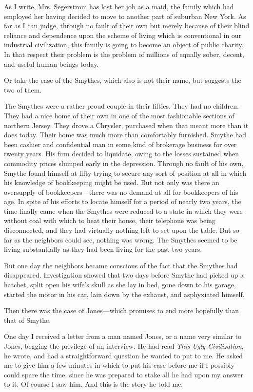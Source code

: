 \documentclass{book}
\begin{document}
As I write, Mrs. Segerstrom has lost her job as a maid, the family which had employed her having decided to move to another part of suburban New York. As far as I can judge, through no fault of their own but merely because of their blind reliance and dependence upon the scheme of living which is conventional in our industrial civilization, this family is going to become an object of public charity. In that respect their problem is the problem of millions of equally sober, decent, and useful human beings today.

Or take the case of the Smythes, which also is not their name, but suggests the two of them.

The Smythes were a rather proud couple in their fifties. They had no children. They had a nice home of their own in one of the most fashionable sections of northern Jersey. They drove a Chrysler, purchased when that meant more than it does today. Their home was much more than comfortably furnished. Smythe had been cashier and confidential man in some kind of brokerage business for over twenty years. His firm decided to liquidate, owing to the losses sustained when commodity prices slumped early in the depression. Through no fault of his own, Smythe found himself at fifty trying to secure any sort of position at all in which his knowledge of bookkeeping might be used. But not only was there an oversupply of bookkeepers—there was no demand at all for bookkeepers of his age. In spite of his efforts to locate himself for a period of nearly two years, the time finally came when the Smythes were reduced to a state in which they were without coal with which to heat their house, their telephone was being disconnected, and they had virtually nothing left to set upon the table. But so far as the neighbors could see, nothing was wrong. The Smythes seemed to be living substantially as they had been living for the past two years.

But one day the neighbors became conscious of the fact that the Smythes had disappeared. Investigation showed that two days before Smythe had picked up a hatchet, split open his wife’s skull as she lay in bed, gone down to his garage, started the motor in his car, lain down by the exhaust, and asphyxiated himself.

Then there was the case of Jones—which promises to end more hopefully than that of Smythe.

One day I received a letter from a man named Jones, or a name very similar to Jones, begging the privilege of an interview. He had read \emph{This Ugly Civilization}, he wrote, and had a straightforward question he wanted to put to me. He asked me to give him a few minutes in which to put his case before me if I possibly could spare the time, since he was prepared to stake all he had upon my answer to it. Of course I saw him. And this is the story he told me.
\end{document}
